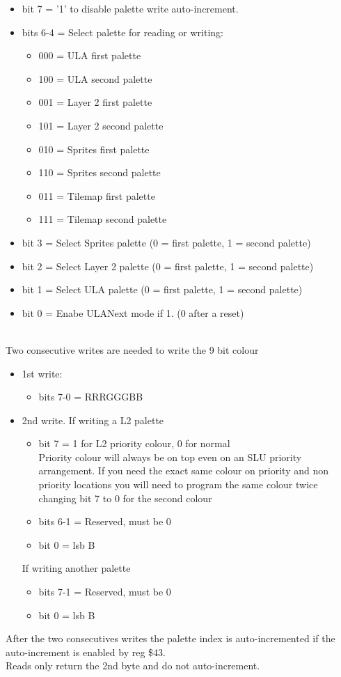 \begin{itemize}
\item bit 7 = '1' to disable palette write auto-increment.
\item bits 6-4 = Select palette for reading or writing:
  \begin{itemize}
  \item 000 = ULA first palette
  \item 100 = ULA second palette
  \item 001 = Layer 2 first palette
  \item 101 = Layer 2 second palette
  \item 010 = Sprites first palette
  \item 110 = Sprites second palette
  \item 011 = Tilemap first palette
  \item 111 = Tilemap second palette
  \end{itemize}
\item bit 3 = Select Sprites palette (0 = first palette, 1 = second palette)
\item bit 2 = Select Layer 2 palette (0 = first palette, 1 = second palette)
\item bit 1 = Select ULA palette (0 = first palette, 1 = second palette)
\item bit 0 = Enabe ULANext mode if 1. (0 after a reset)
\end{itemize}

\\
Two consecutive writes are needed to write the 9 bit colour
\begin{itemize}
\item 1st write:
  \begin{itemize}
  \item bits 7-0 = RRRGGGBB
  \end{itemize}
\item[] 2nd write.
  If writing a L2 palette\\
  \begin{itemize}
  \item bit 7 = 1 for L2 priority colour, 0 for normal\\
    Priority colour will always be on top even on an SLU priority
    arrangement. If you need the exact same colour on priority and non
    priority locations you will need to program the same colour twice
    changing bit 7 to 0 for the second colour
  \item bits 6-1 = Reserved, must be 0
  \item bit 0 = lsb B
  \end{itemize}
  If writing another palette
  \begin{itemize}
  \item bits 7-1 = Reserved, must be 0
  \item bit 0 = lsb B
  \end{itemize}
\end{itemize}
After the two consecutives writes the palette index is
auto-incremented if the auto-increment is enabled by reg \$43.\\
Reads only return the 2nd byte and do not auto-increment.

